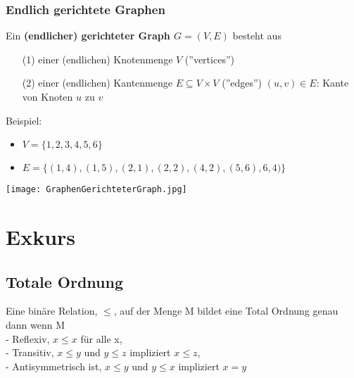 		\subsubsection{Endlich gerichtete Graphen}
			\begin{minipage}{0.6\textwidth}
				Ein \textbf{(endlicher) gerichteter Graph $G = (V,E)$} besteht aus
				\begin{itemize}
					\item[(1)] einer (endlichen) Knotenmenge $V$ (''vertices'')
					\item[(2)] einer (endlichen) Kantenmenge $ E \subseteq V \times V$ (''edges'') 
							$(u,v) \in E$: Kante von Knoten $u$ zu $v$ \\
				\end{itemize}

				Beispiel: 
				\begin{itemize}
					\item $V = \{1,2,3,4,5,6\}$
					\item $E = \{(1,4),(1,5),(2,1),(2,2),(4,2),(5,6),6,4)\}$
				\end{itemize}
			\end{minipage}
			\hspace{1cm}
			\begin{minipage}{0.35\textwidth}
				\begin{center}
					\texttt{[image: GraphenGerichteterGraph.jpg]}
				\end{center}
			\end{minipage}


\newpage
\section{Exkurs}
	\subsection{Totale Ordnung}
		Eine binäre Relation, $\leq$, auf der Menge M bildet eine Total Ordnung genau dann wenn M \\
		- Reflexiv, $x \leq x$ für alle x, \\
		- Transitiv, $x \leq y$ und $y \leq z$ impliziert $x \leq z$, \\
		- Antisymmetrisch ist, $x \leq y$ und $y \leq x$ impliziert $x = y$



\vspace{1.5cm}
 